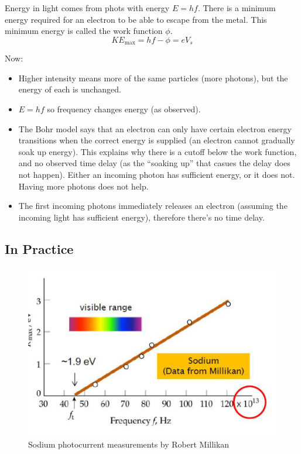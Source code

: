 Energy in light comes from phots with energy $E = hf$. There is a minimum energy required for an electron to be able to escape from the metal. This minimum energy is called the work function $\phi$.
\[
    KE_\text{max} = hf - \phi = eV_s
\]

Now:
\begin{itemize}
    \item Higher intensity means more of the same particles (more photons), but the energy of each is unchanged.
    \item $E = hf$ so frequency changes energy (as observed).
    \item The Bohr model says that an electron can only have certain electron energy transitions when the correct energy is supplied (an electron cannot gradually soak up energy). This explains why there is a cutoff below the work function, and no observed time delay (as the ``soaking up'' that casues the delay does not happen). Either an incoming photon has sufficient energy, or it does not. Having more photons does not help.
    \item The first incoming photons immediately releases an electron (assuming the incoming light has sufficient energy), therefore there's no time delay.
\end{itemize}

\subsection*{In Practice}
\begin{figure}[H]
    \centering
    \includegraphics{figures/lec03-05.png}
     \caption{Sodium photocurrent measurements by Robert Millikan}
\end{figure}


